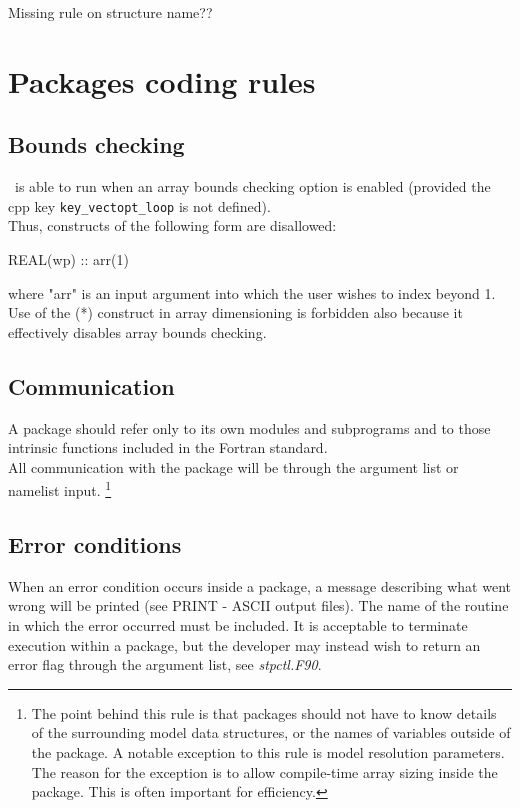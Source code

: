 Missing rule on structure name??

\section{Packages coding rules}

\subsection{Bounds checking}

\NEMO\ is able to run when an array bounds checking option is enabled
(provided the cpp key \texttt{key\_vectopt\_loop} is not defined). \\
Thus, constructs of the following form are disallowed:

\begin{forlines}
REAL(wp) :: arr(1)
\end{forlines}

where "arr" is an input argument into which the user wishes to index beyond 1.
Use of the (*) construct in array dimensioning is forbidden also because
it effectively disables array bounds checking.

\subsection{Communication}

A package should refer only to its own modules and subprograms and to those intrinsic functions included in
the Fortran standard. \\
All communication with the package will be through the argument list or namelist input.
\footnote{
  The point behind this rule is that packages should not have to know details of
  the surrounding model data structures, or the names of variables outside of the package.
  A notable exception to this rule is model resolution parameters.
  The reason for the exception is to allow compile-time array sizing inside the package.
  This is often important for efficiency.
}

\subsection{Error conditions}

When an error condition occurs inside a package, a message describing what went wrong will be printed
(see PRINT - ASCII output files).
The name of the routine in which the error occurred must be included.
It is acceptable to terminate execution within a package, but
the developer may instead wish to return an error flag through the argument list,
see \textit{stpctl.F90}.

